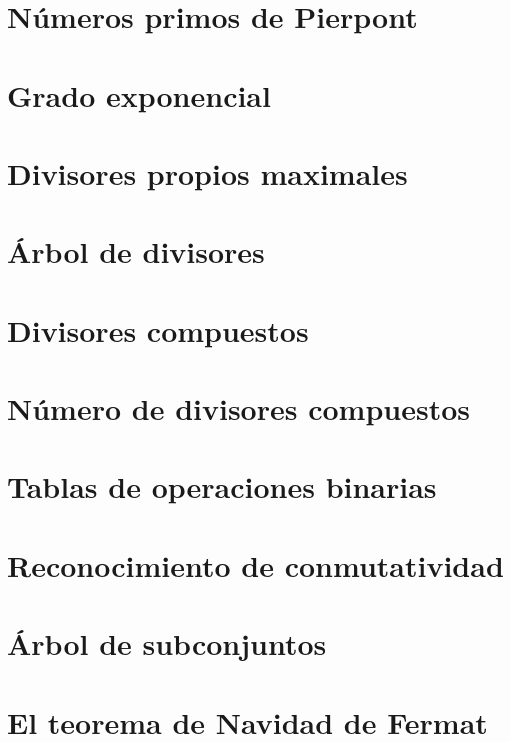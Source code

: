 \documentclass[a4paper,12pt,twoside]{book}
\begin{document}
\chapter{Números primos de Pierpont}
\label{181218}

\chapter{Grado exponencial}
\label{191218}

\chapter{Divisores propios maximales}
\label{201218}

\chapter{Árbol de divisores}
\label{211218}

\chapter{Divisores compuestos}
\label{181224}

\chapter{Número de divisores compuestos}
\label{181225}

\chapter{Tablas de operaciones binarias}
\label{181226}

\chapter{Reconocimiento de conmutatividad}
\label{181227}

\chapter{Árbol de subconjuntos}
\label{181228}

\chapter{El teorema de Navidad de Fermat}
\label{181231}
\end{document}
